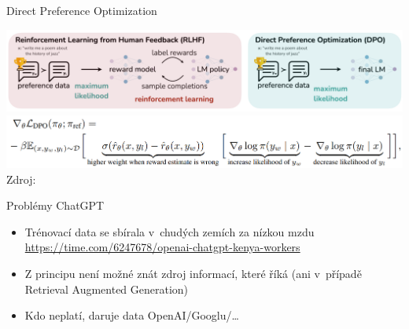 \documentclass[aspectratio=169,dvipsnames]{beamer}
\begin{document}

\begin{frame}{Direct Preference Optimization}

    \centering
    \includegraphics[width=.9\textwidth]{img/dpo.png} \\[1em]
    \includegraphics[width=.9\textwidth]{img/dpo-equation.png} \\

    \tiny Zdroj: \citet{rafailov2024direct}

\end{frame}


\begin{frame}{Problémy ChatGPT}

    \begin{itemize}

        \item Trénovací data se sbírala v~chudých zemích za nízkou mzdu {\tiny \\
            \url{https://time.com/6247678/openai-chatgpt-kenya-workers}}

		\item Z principu není možné znát zdroj informací, které říká {\small (ani v~případě Retrieval Augmented Generation)}

        \item Kdo neplatí, daruje data OpenAI/Googlu/\ldots

    \end{itemize}



\end{frame}
\end{document}
